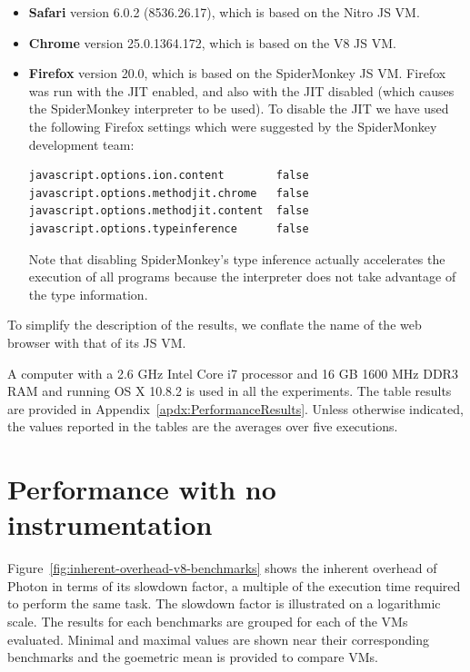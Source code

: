 \begin{itemize}

\item
{\bf Safari} version 6.0.2 (8536.26.17), which is based on the Nitro JS VM.

\item
{\bf Chrome} version 25.0.1364.172, which is based on the V8 JS VM.

\item
{\bf Firefox} version 20.0, which is based on the SpiderMonkey
JS VM.  Firefox was run with the JIT enabled, and also with
the JIT disabled (which causes the SpiderMonkey interpreter to be
used).  To disable the JIT we have used the following Firefox settings
which were suggested by the SpiderMonkey development team:

{\small
\begin{verbatim}
javascript.options.ion.content        false
javascript.options.methodjit.chrome   false 
javascript.options.methodjit.content  false
javascript.options.typeinference      false
\end{verbatim}
}

Note that disabling SpiderMonkey's type inference actually
accelerates the execution of all programs because the interpreter does
not take advantage of the type information.

\end{itemize}

To simplify the description of the results, we conflate the name of
the web browser with that of its JS VM.

A computer with a 2.6 GHz Intel Core i7 processor and 16 GB 1600 MHz
DDR3 RAM and running OS X 10.8.2 is used in all the experiments.
The table results are provided in Appendix~\ref{apdx:PerformanceResults}.
Unless otherwise indicated, the values reported in the tables are the
averages over five executions.

\section{Performance with no instrumentation}

Figure~\ref{fig:inherent-overhead-v8-benchmarks} shows the inherent overhead of
Photon in terms of its slowdown factor, a multiple of the execution time
required to perform the same task. The slowdown factor is illustrated on a
logarithmic scale. The results for each benchmarks are grouped for each of the
VMs evaluated. Minimal and maximal values are shown near their corresponding
benchmarks and the goemetric mean is provided to compare VMs.

